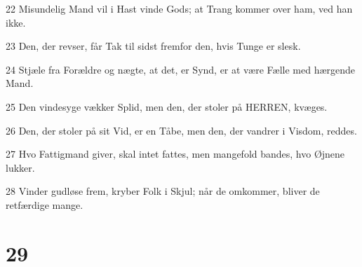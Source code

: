 \par 22 Misundelig Mand vil i Hast vinde Gods; at Trang kommer over ham, ved han ikke.
\par 23 Den, der revser, får Tak til sidst fremfor den, hvis Tunge er slesk.
\par 24 Stjæle fra Forældre og nægte, at det, er Synd, er at være Fælle med hærgende Mand.
\par 25 Den vindesyge vækker Splid, men den, der stoler på HERREN, kvæges.
\par 26 Den, der stoler på sit Vid, er en Tåbe, men den, der vandrer i Visdom, reddes.
\par 27 Hvo Fattigmand giver, skal intet fattes, men mangefold bandes, hvo Øjnene lukker.
\par 28 Vinder gudløse frem, kryber Folk i Skjul; når de omkommer, bliver de retfærdige mange.

\chapter{29}

